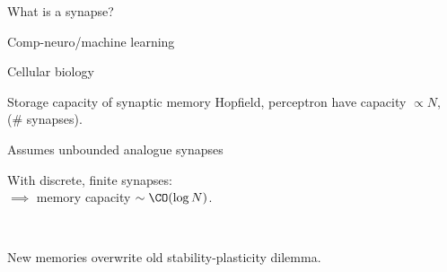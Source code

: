 \documentclass[final]{beamer}%
\begin{document}
\begin{frame}{What is a synapse?}
%
 \begin{center}
\begin{overlayarea}{0.95\linewidth}{0.1\textheight}
 {\parbox[c]{0.45\linewidth}{
   \begin{center}
     Comp-neuro/machine learning
   \end{center}
 }}
 {\parbox[c]{0.45\linewidth}{
   \begin{center}
     Cellular biology
   \end{center}
 }}
\end{overlayarea}

\begin{overlayarea}{0.95\linewidth}{0.7\textheight}
%
 {\parbox[c]{0.45\linewidth}{
 }}
 {\parbox[c]{0.45\linewidth}{
 }}
\end{overlayarea}
 \end{center}
%
\end{frame}



\begin{frame}{Storage capacity of synaptic memory}
%
  Hopfield, perceptron have capacity \alert{$\propto N$}, (\# synapses).

\vp\parbox[t]{0.59\linewidth}{%
  Assumes unbounded analogue synapses

 \vp With discrete, finite synapses:\\
 $\implies$ memory capacity  \alert{$\sim\CO(\log N)$}.
 \\ 
 }
 \parbox[t]{0.4\linewidth}{
    \hfill{}
 }
 \\


 \vp New memories overwrite old
 \impl stability-plasticity dilemma.
%
\end{frame}
\end{document}
